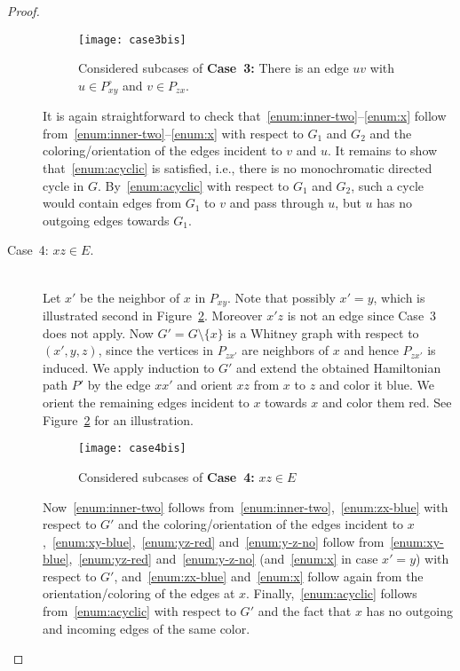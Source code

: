 \documentclass[a4paper,10pt]{article}
\theoremstyle{plain}
\newcommand{\inner}[1]{{#1}^{\circ}}
\begin{document}
\begin{proof}
\begin{description}
   \begin{figure}[tb]
    \centering
    \texttt{[image: case3bis]}
    \caption{Considered subcases of \textbf{Case~3:} There is an edge $uv$ with $u \in \inner{P}_{xy}$ and $v \in P_{zx}$.}
    \label{fig:case3}
   \end{figure}
 
   It is again straightforward to check that~\ref{enum:inner-two}--\ref{enum:x} follow from~\ref{enum:inner-two}--\ref{enum:x} with respect to $G_1$ and $G_2$ and the coloring/orientation of the edges incident to $v$ and $u$. It remains to show that~\ref{enum:acyclic} is satisfied, i.e., there is no monochromatic directed cycle in $G$. By~\ref{enum:acyclic} with respect to $G_1$ and $G_2$, such a cycle would contain edges from $G_1$ to $v$ and pass through $u$, but $u$ has no outgoing edges towards $G_1$.
   
  \item[Case~4: $xz \in E$.]{\ \\}  
   Let $x'$ be the neighbor of $x$ in $P_{xy}$. Note that possibly $x' = y$, which is illustrated second in Figure~\ref{fig:case4}. Moreover $x'z$ is not an edge since Case~3 does not apply. Now $G' = G \setminus \{x\}$ is a Whitney graph with respect to $(x',y,z)$, since the vertices in $P_{zx'}$ are neighbors of $x$ and hence $P_{zx'}$ is induced. We apply induction to $G'$ and extend the obtained Hamiltonian path $P'$ by the edge $xx'$ and orient $xz$ from $x$ to $z$ and color it blue. We orient the remaining edges incident to $x$ towards $x$ and color them red. See Figure~\ref{fig:case4} for an illustration.
 
   \begin{figure}[tb]
    \centering
    \texttt{[image: case4bis]}
    \caption{Considered subcases of \textbf{Case~4:} $xz \in E$}
    \label{fig:case4}
   \end{figure}
 
   Now~\ref{enum:inner-two} follows from~\ref{enum:inner-two},~\ref{enum:zx-blue} with respect to $G'$ and the coloring/orientation of the edges incident to $x$,~\ref{enum:xy-blue},~\ref{enum:yz-red} and~\ref{enum:y-z-no} follow from~\ref{enum:xy-blue},~\ref{enum:yz-red} and~\ref{enum:y-z-no} (and~\ref{enum:x} in case $x'=y$) with respect to $G'$, and~\ref{enum:zx-blue} and~\ref{enum:x} follow again from the orientation/coloring of the edges at $x$. Finally,~\ref{enum:acyclic} follows from~\ref{enum:acyclic} with respect to $G'$ and the fact that $x$ has no outgoing and incoming edges of the same color.
   

\end{description}
\end{proof}
\end{document}
